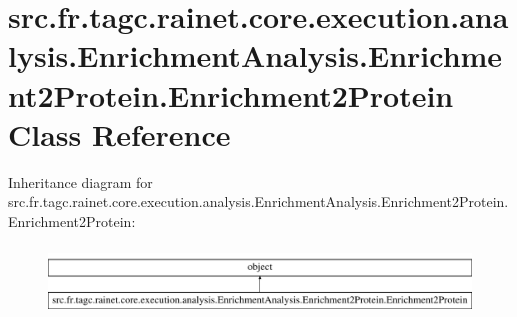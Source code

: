 \hypertarget{classsrc_1_1fr_1_1tagc_1_1rainet_1_1core_1_1execution_1_1analysis_1_1EnrichmentAnalysis_1_1Enric6c627eb5bd04b7c51c1ec93bc189786a}{\section{src.\-fr.\-tagc.\-rainet.\-core.\-execution.\-analysis.\-Enrichment\-Analysis.\-Enrichment2\-Protein.\-Enrichment2\-Protein Class Reference}
\label{classsrc_1_1fr_1_1tagc_1_1rainet_1_1core_1_1execution_1_1analysis_1_1EnrichmentAnalysis_1_1Enric6c627eb5bd04b7c51c1ec93bc189786a}
}
Inheritance diagram for src.\-fr.\-tagc.\-rainet.\-core.\-execution.\-analysis.\-Enrichment\-Analysis.\-Enrichment2\-Protein.\-Enrichment2\-Protein\-:\begin{figure}[H]
\begin{center}
\leavevmode
\includegraphics[height=1.879195cm]{classsrc_1_1fr_1_1tagc_1_1rainet_1_1core_1_1execution_1_1analysis_1_1EnrichmentAnalysis_1_1Enric6c627eb5bd04b7c51c1ec93bc189786a}
\end{center}
\end{figure}
